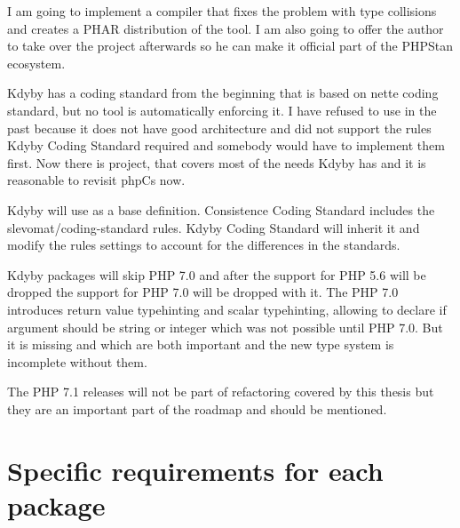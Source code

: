 I am going to implement a compiler that fixes the problem with type collisions and creates a PHAR distribution of the tool. I am also going to offer the author to take over the project afterwards so he can make it official part of the PHPStan ecosystem.


Kdyby has a coding standard from the beginning that is based on \gls{nette} coding standard, but no tool is automatically enforcing it. I have refused to use  in the past because it does not have good architecture and did not support the rules Kdyby Coding Standard required and somebody would have to implement them first. Now there is  project, that covers most of the needs Kdyby has and it is reasonable to revisit \gls{phpCs} now.

Kdyby will use  as a base definition. Consistence Coding Standard includes the slevomat/coding-standard rules. Kdyby Coding Standard will inherit it and modify the rules settings to account for the differences in the standards.


Kdyby packages will skip PHP 7.0 and after the support for PHP 5.6 will be dropped the support for PHP 7.0 will be dropped with it. The PHP 7.0 introduces return value typehinting and scalar typehinting, allowing to declare if argument should be string or integer which was not possible until PHP 7.0. But it is missing  and  which are both important and the new type system is incomplete without them.

The PHP 7.1 releases will not be part of refactoring covered by this thesis but they are an important part of the roadmap and should be mentioned.

\section{Specific requirements for each package} \label{sec:roadmap:each-package}


